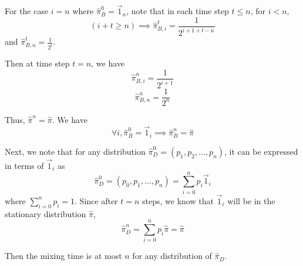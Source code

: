 \documentclass[11pt]{article} %
\begin{document}
For the case $i=n$ where $\hat{\pi}_B^0=\vec{1}_n$, note that in each time step $t\leq n$, for $i<n$,
\[(i+t\geq n) \implies \hat{\pi}_{B,i}^t = \frac{1}{2^{i+1+t-n}}\]
and $\hat{\pi}_{B,n}^t=\frac{1}{2^t}$.

Then at time step $t=n$, we have
\[\hat{\pi}_{B,i}^n = \frac{1}{2^{i+1}}\]
\[\hat{\pi}_{B,n}^n=\frac{1}{2^n}\]

Thus, $\hat{\pi}^n=\hat{\pi}$.
We have 
\[\forall i, \hat{\pi}_B^0=\vec{1}_i \implies \hat{\pi}_B^n=\hat{\pi}\]

Next, we note that for any distribution $\hat{\pi}_D^0=(p_1,p_2,...,p_n)$,
it can be expressed in terms of $\vec{1}_i$ as
\[\hat{\pi}_D^0=(p_0,p_1,...,p_n)=\sum_{i=0}^n p_i \vec{1}_i\]
where $\sum_{i=0}^n p_i =1$.
Since after $t=n$ steps, we know that $\vec{1}_i$ will be in the stationary distribution $\hat{\pi}$,
\[\hat{\pi}_D^n = \sum_{i=0}^n p_i \hat{\pi} = \hat{\pi}\]

Then the mixing time is at most $n$ for any distribution of $\hat{\pi}_D$.
\end{document}
